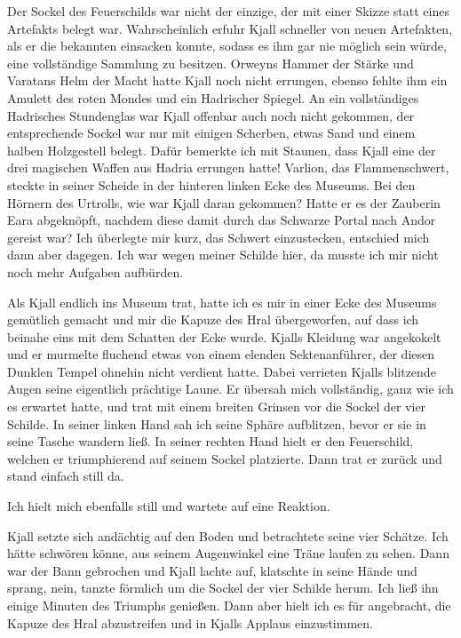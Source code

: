 \documentclass[10pt, a4paper, oneside]{book}
\begin{document}
Der Sockel des Feuerschilds war nicht der einzige, der mit einer Skizze statt eines Artefakts belegt war. Wahrscheinlich erfuhr Kjall schneller von neuen Artefakten, als er die bekannten einsacken konnte, sodass es ihm gar nie möglich sein würde, eine vollständige Sammlung zu besitzen. Orweyns Hammer der Stärke und Varatans Helm der Macht hatte Kjall noch nicht errungen, ebenso fehlte ihm ein Amulett des roten Mondes und ein Hadrischer Spiegel. An ein vollständiges Hadrisches Stundenglas war Kjall offenbar auch noch nicht gekommen, der entsprechende Sockel war nur mit einigen Scherben, etwas Sand und einem halben Holzgestell belegt. Dafür bemerkte ich mit Staunen, dass Kjall eine der drei magischen Waffen aus Hadria errungen hatte! Varlion, das Flammenschwert, steckte in seiner Scheide in der hinteren linken Ecke des Museums. Bei den Hörnern des Urtrolls, wie war Kjall daran gekommen? Hatte er es der Zauberin Eara abgeknöpft, nachdem diese damit durch das Schwarze Portal nach Andor gereist war? Ich überlegte mir kurz, das Schwert einzustecken, entschied mich dann aber dagegen. Ich war wegen meiner Schilde hier, da musste ich mir nicht noch mehr Aufgaben aufbürden.\bigskip



Als Kjall endlich ins Museum trat, hatte ich es mir in einer Ecke des Museums gemütlich gemacht und mir die Kapuze des Hral übergeworfen, auf dass ich beinahe eins mit dem Schatten der Ecke wurde. Kjalls Kleidung war angekokelt und er murmelte fluchend etwas von einem elenden Sektenanführer, der diesen Dunklen Tempel ohnehin nicht verdient hatte. Dabei verrieten Kjalls blitzende Augen seine eigentlich prächtige Laune. Er übersah mich vollständig, ganz wie ich es erwartet hatte, und trat mit einem breiten Grinsen vor die Sockel der vier Schilde. In seiner linken Hand sah ich seine Sphäre aufblitzen, bevor er sie in seine Tasche wandern ließ. In seiner rechten Hand hielt er den Feuerschild, welchen er triumphierend auf seinem Sockel platzierte. Dann trat er zurück und stand einfach still da.

Ich hielt mich ebenfalls still und wartete auf eine Reaktion.

Kjall setzte sich andächtig auf den Boden und betrachtete seine vier Schätze. Ich hätte schwören könne, aus seinem Augenwinkel eine Träne laufen zu sehen. Dann war der Bann gebrochen und Kjall lachte auf, klatschte in seine Hände und sprang, nein, tanzte förmlich um die Sockel der vier Schilde herum. Ich ließ ihn einige Minuten des Triumphs genießen. Dann aber hielt ich es für angebracht, die Kapuze des Hral abzustreifen und in Kjalls Applaus einzustimmen.
\end{document}
